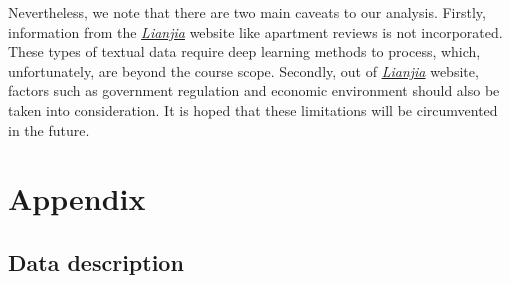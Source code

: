 \documentclass[11pt,a4paper]{article}
\begin{document}
Nevertheless, we note that there are two main caveats to our analysis. Firstly, information from the \href{https://sh.lianjia.com/ershoufang}{\textit{Lianjia}} website like apartment reviews is not incorporated. These types of textual data require deep learning methods to process, which, unfortunately, are beyond the course scope. Secondly, out of \href{https://sh.lianjia.com/ershoufang}{\textit{Lianjia}} website, factors such as government regulation and economic environment should also be taken into consideration. It is hoped that these limitations will be circumvented in the future.


\newpage
\section{Appendix}
\subsection{Data description}
\begin{figure}[H]
    \centering
    \end{figure}
\end{document}
